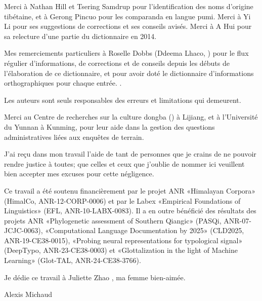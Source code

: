 Merci à Nathan Hill et Tsering Samdrup pour l'identification des noms d'origine tibétaine, et à Gerong Pincuo  pour les comparanda en langue pumi. Merci à Yi Li  pour ses suggestions de corrections et ses conseils avisés. Merci à A Hui  pour sa relecture d’une partie du dictionnaire en 2014.

Mes remerciements particuliers à Roselle Dobbs (Ddeema Lhaco, ) pour le flux régulier d’informations, de corrections et de conseils depuis les débuts de l’élaboration de ce dictionnaire, et pour avoir doté le dictionnaire d'informations orthographiques pour chaque entrée.  \parencite[vi]{yliniemi_descriptive_2022}.

Les auteurs sont seuls responsables des erreurs et limitations qui demeurent.

Merci au Centre de recherches sur la culture dongba () à Lijiang, et à l’Université du Yunnan à Kunming, pour leur aide dans la gestion des questions administratives liées aux enquêtes de terrain.

J’ai reçu dans mon travail l’aide de tant de personnes que je crains de ne pouvoir rendre justice à toutes; que celles et ceux que j’oublie de nommer ici veuillent bien accepter mes excuses pour cette négligence.

Ce travail a été soutenu financièrement par le projet ANR «Himalayan Corpora» (HimalCo, ANR-12-CORP-0006) et par le Labex «Empirical Foundations of Linguistics» (EFL, ANR-10-LABX-0083). Il a en outre bénéficié des résultats des projets ANR «Phylogenetic assessment of Southern Qiangic» (PASQi, ANR-07-JCJC-0063), «Computational Language Documentation by 2025» (CLD2025, ANR-19-CE38-0015), «Probing neural representations for typological signal» (DeepTypo, ANR-23-CE38-0003) et «Glottalization in the light of Machine Learning» (Glot-TAL, ANR-24-CE38-3766).

Je dédie ce travail à Juliette Zhao , ma femme bien-aimée.

{\raggedleft Alexis Michaud\par}

